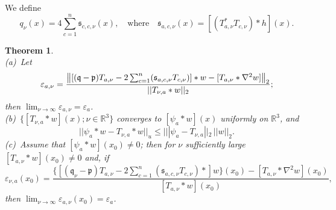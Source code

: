 \documentclass[english, reqno]{amsart}
\newtheorem{thm}{Theorem}[]
\newcommand{\IR}{\text{${\mathbb{R}}$}}
\newcommand{\p}{\mathfrak{p}}
\newcommand{\q}{\mathfrak{q}}
\newcommand{\s}{\mathfrak{s}}
\begin{document}
 We define
 \[
 q_{\nu}(x)=4\sum_{c=1}^n\s_{c,c,\nu}(x),\quad \text {where}\quad \s_{a,c,\nu}(x)=[(T^{\ast}_{a,\nu}T_{c,\nu})\ast h](x).
  \]
\begin{thm}\label{thm4}\hspace{1in}\\
(a)\ Let
\begin{equation} \label{eq11}
 \varepsilon_{a,\nu}= 
 \frac{\big{\Vert} [(\q -\p )T_{a,\nu } -2\sum_{c=1}^n(\s_{a,c,\nu} T_{c,\nu}) ] \ast w -  [ T_{a, \nu}\ast \nabla^2w ] \big{\Vert}_2}
 {||T_{\nu,a} \ast w ||_2};
 \end{equation}
then $\lim_{\nu\rightarrow \infty}\varepsilon_{a,\nu}=\varepsilon_a$.\\
(b)\ $\{[T_{\nu,a}\ast w](x); \nu \in \IR^3\}$ converges to $[\psi_a\ast w](x)$ uniformly on $\IR^3$, and
\begin{equation} \label{eq12}
|| \psi_a\ast w-T_{\nu,a}\ast w||_u \le |||\psi_a-T_{\nu,a}||_2\,||w||_2.
\end{equation}
(c)\ Assume that $[\psi_a\ast w](x_0)\ne 0$; then for $\nu$ sufficiently large $[T_{a,\nu}\ast w](x_0) \ne 0$ and, if
\begin{equation} \label{eq13}
\varepsilon_{\nu,a}(x_0)= \frac{\{[(\q _{\nu}-\p )T_{a,\nu } -2\sum_{c=1}^n(\s_{a,c,\nu} T_{c,\nu})\ast] w \}(x_0)-  [ T_{a, \nu}\ast \nabla^2w ] (x_0)}{[T_{a,\nu}\ast w](x_0)},
\end{equation}
then $\lim_{\nu \rightarrow \infty}\varepsilon_{a,\nu}(x_0)= \varepsilon_a$.
\end{thm}
\end{document}
